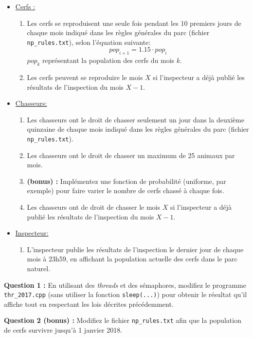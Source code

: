 \documentclass[CC,sansRappel,12pt]{tdtp-utf8}
\begin{document}
\begin{feuille}
\begin{exercice}
\begin{itemize}
\item \underline{Cerfs :}
\begin{enumerate}
\item Les cerfs se reproduisent une seule fois pendant les 10 premiers jours de chaque mois indiqué dans les règles générales du parc (fichier \texttt{np\_rules.txt}), selon l'équation suivante: $$pop_{i+1} = 1.15\cdot pop_{i}$$ $pop_k$  représentant la population des cerfs du mois $k$.
\item Les cerfs peuvent se reproduire le mois $X$ si l'inspecteur a déjà publié les résultats de l'inspection du mois $X-1$.
\end{enumerate}
\item \underline{Chasseurs:}
\begin{enumerate}
\item Les chasseurs ont le droit de chasser seulement un jour dans la deuxième quinzaine de chaque mois indiqué dans les règles générales du parc (fichier \texttt{np\_rules.txt}).
\item Les chasseurs ont le droit de chasser un maximum de 25 animaux par mois.
\item[] \textbf{(bonus) : } Implémentez une fonction de probabilité (uniforme, par exemple) pour faire varier le nombre de cerfs chassé à chaque fois.
\item Les chasseurs ont de droit de chasser le mois $X$ si l'inspecteur a déjà publié les résultats de l'inspection du mois $X-1$.
\end{enumerate}
\item \underline{Inspecteur:}
\begin{enumerate}
\item L'inspecteur publie les résultats de l'inspection le dernier jour de chaque mois à 23h59, en affichant la population actuelle des cerfs dans le parc naturel.
\end{enumerate}
\end{itemize}

\textbf{Question 1 : } {En utilisant des \textit{threads} et des sémaphores, modifiez le programme \texttt{thr\_2017.cpp} (sans utiliser la fonction \texttt{sleep(...)}) pour obtenir le résultat qu'il affiche tout en respectant les lois décrites précédemment.}

\textbf{Question 2 (bonus) :} {Modifiez le fichier \texttt{np\_rules.txt} afin que la population de cerfs survivre jusqu'à 1 janvier 2018. }

\end{exercice}

\end{feuille}
\end{document}
